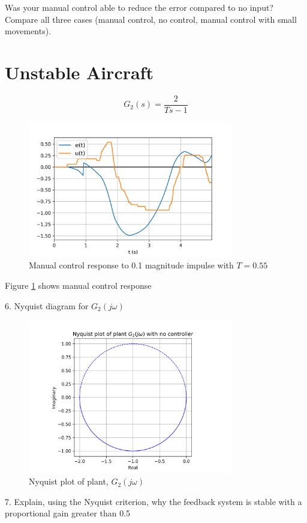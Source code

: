 \documentclass[8pt]{article}
\begin{document}
Was your manual control able to reduce the error compared to no input? Compare all three cases (manual control, no control, manual control with small movements).

\section{Unstable Aircraft}

\begin{equation}
    G_2(s) = \frac{2}{Ts-1}
\end{equation}

\begin{figure}[H]
    \centering
    \includegraphics[width=0.8\textwidth]{figures/FIGURE_11.png}
    \caption{Manual control response to 0.1 magnitude impulse with $T=0.55$}
    \label{fig:figure11}
\end{figure}

Figure \ref{fig:figure11} shows manual control response

6. Nyquist diagram for $G_2(j\omega)$
\begin{figure}[H]
    \centering
    \includegraphics[width=0.8\textwidth]{figures/nyquist2.png}
    \caption{Nyquist plot of plant, $G_2(j\omega)$}
    \label{fig:nyquist2}
\end{figure}
7. Explain, using the Nyquist criterion, why the feedback system is stable with a proportional gain greater than 0.5
\end{document}
